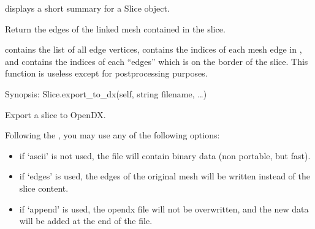 \documentclass[a4paper,11pt,english]{sphinxmanual}
\begin{document}
\begin{fulllineitems}
\begin{fulllineitems}
\end{fulllineitems}


\begin{fulllineitems}
\label{\detokenize{python/cmdref_Slice:getfem.Slice.display}}
displays a short summary for a Slice object.

\end{fulllineitems}


\begin{fulllineitems}
\label{\detokenize{python/cmdref_Slice:getfem.Slice.edges}}
Return the edges of the linked mesh contained in the slice.

 contains the list of all edge vertices,  contains
the indices of each mesh edge in , and  contains the
indices of each “edges” which is on the border of the slice.
This function is useless except for post\sphinxhyphen{}processing purposes.

\end{fulllineitems}


\begin{fulllineitems}
\label{\detokenize{python/cmdref_Slice:getfem.Slice.export_to_dx}}
Synopsis: Slice.export\_to\_dx(self, string filename, …)

Export a slice to OpenDX.

Following the , you may use any of the following
options:
\begin{itemize}
\item {} 
if ‘ascii’ is not used, the file will contain binary data
(non portable, but fast).

\item {} 
if ‘edges’ is used, the edges of the original mesh will be
written instead of the slice content.

\item {} 
if ‘append’ is used, the opendx file will not be overwritten,
and the new data will be added at the end of the file.


\end{itemize}
\end{fulllineitems}
\end{fulllineitems}
\end{document}
